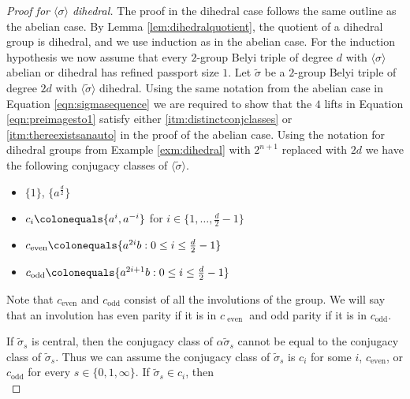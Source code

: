 \documentclass{dcthesis}
\newcommand{\defi}[1]{\textsf{#1}}
\newcommand{\wt}[1]{\widetilde{#1}}
\numberwithin{equation}{section}
\theoremstyle{definition}
\theoremstyle{remark}
\begin{document}
{{\begin{proof}[Proof for $\langle\sigma\rangle$ dihedral]
      The proof in the dihedral case
      follows the same outline as the abelian case.
      By Lemma \ref{lem:dihedralquotient},
      the quotient of a dihedral group is
      dihedral, and we use induction
      as in the abelian case.
      For the induction hypothesis we now assume
      that every $2$-group Belyi triple of degree
      $d$ with $\langle\sigma\rangle$
      abelian or dihedral has
      refined passport size $1$.
      Let $\wt{\sigma}$
      be a $2$-group Belyi triple of degree $2d$
      with $\langle\wt{\sigma}\rangle$
      dihedral.
      Using the same notation from
      the abelian case in
      Equation \ref{eqn:sigmasequence}
      we are required to show that the
      $4$ lifts in
      Equation \ref{eqn:preimagesto1}
      satisfy either
      \ref{itm:distinctconjclasses}
      or
      \ref{itm:thereexistsanauto}
      in the proof of the abelian case.
      Using the notation for dihedral groups
      from Example \ref{exm:dihedral}
      with $2^{n+1}$ replaced with $2d$
      we have the following conjugacy classes
      of $\langle\wt{\sigma}\rangle$.
      \begin{itemize}
        \item
          $ \{1\} $,
          $ \{a^{\frac{d}{2}}\} $
        \item
          $c_i\colonequals \{a^i,a^{-i}\}$
          for $i\in \{1,\dots,\frac{d}{2}-1\}$
        \item
          $c_\text{even}
          \colonequals
          \{a^{2i}b : 0\leq i\leq \frac{d}{2}-1\}$
        \item
          $c_\text{odd}
          \colonequals
          \{a^{2i+1}b : 0\leq i\leq \frac{d}{2}-1\}$
      \end{itemize}
      Note that $c_\text{even}$ and $c_\text{odd}$
      consist of all the involutions of the group.
      We will say that an involution has
      \defi{even parity}
      if it is in $c_\text{ even }$
      and \defi{odd parity}
      if it is in $c_\text{odd}$.
      \par
      If $\wt{\sigma}_s$ is central,
      then the conjugacy class of
      $\alpha\wt{\sigma}_s$ cannot be equal to
      the conjugacy class of
      $\wt{\sigma}_s$.
      Thus we can assume
      the conjugacy class of
      $\wt{\sigma}_s$
      is $c_i$ for some $i$,
      $c_\text{even}$, or
      $c_\text{odd}$ for every $s\in \{0,1,\infty\}$.
      If $\wt{\sigma}_s\in c_i$,
      then
      \begin{equation}
        \label{eqn:alphaci}

\end{equation}
\end{proof}}}
\end{document}
